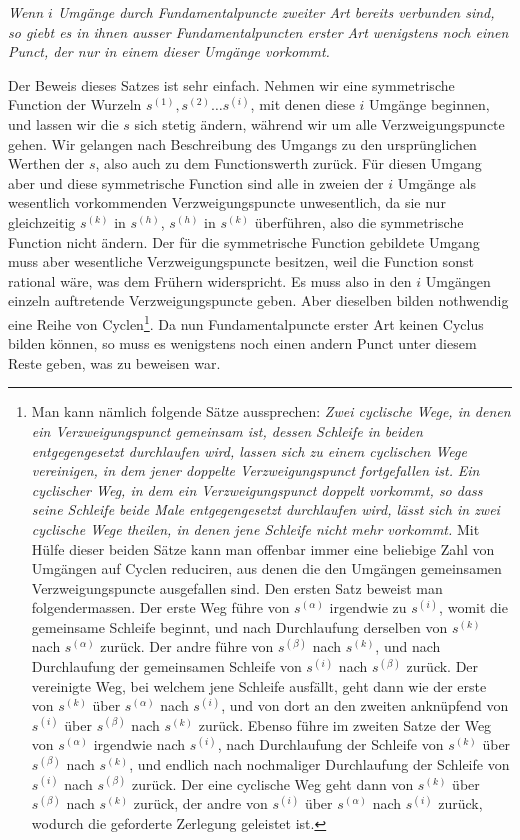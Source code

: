\documentclass[10pt]{article}
\begin{document}
\begin{center}
\emph{Wenn \(i\) Umgänge durch Fundamentalpuncte zweiter Art bereits verbunden sind, so giebt es in ihnen ausser Fundamentalpuncten erster Art wenigstens noch einen Punct, der nur in einem dieser Umgänge vorkommt.}
\end{center}

Der Beweis dieses Satzes ist sehr einfach. Nehmen wir eine symmetrische Function der Wurzeln \(s^{(1)},s^{(2)}\ldots s^{(i)}\), mit denen diese \(i\) Umgänge beginnen, und lassen wir die \(s\) sich stetig ändern, während wir um alle Verzweigungspuncte gehen. Wir gelangen nach Beschreibung des Umgangs zu den ursprünglichen Werthen der \(s\), also auch zu dem Functionswerth zurück. Für diesen Umgang aber und diese symmetrische Function sind alle in zweien der \(i\) Umgänge als wesentlich vorkommenden Verzweigungspuncte unwesentlich, da sie nur gleichzeitig \(s^{(k)}\) in \(s^{(h)}\), \(s^{(h)}\) in \(s^{(k)}\) überführen, also die symmetrische Function nicht ändern. Der für die symmetrische Function gebildete Umgang muss aber wesentliche Verzweigungspuncte besitzen, weil die Function sonst rational wäre, was dem Frühern widerspricht. Es muss also in den \(i\) Umgängen einzeln auftretende Verzweigungspuncte geben. Aber dieselben bilden nothwendig eine Reihe von Cyclen\footnote{Man kann nämlich folgende Sätze aussprechen: \emph{Zwei cyclische Wege, in denen ein Verzweigungspunct gemeinsam ist, dessen Schleife in beiden entgegengesetzt durchlaufen wird, lassen sich zu einem cyclischen Wege vereinigen, in dem jener doppelte Verzweigungspunct fortgefallen ist.} \emph{Ein cyclischer Weg, in dem ein Verzweigungspunct doppelt vorkommt, so dass seine Schleife beide Male entgegengesetzt durchlaufen wird, lässt sich in zwei cyclische Wege theilen, in denen jene Schleife nicht mehr vorkommt.} Mit Hülfe dieser beiden Sätze kann man offenbar immer eine beliebige Zahl von Umgängen auf Cyclen reduciren, aus denen die den Umgängen gemeinsamen Verzweigungspuncte ausgefallen sind. Den ersten Satz beweist man folgendermassen. Der erste Weg führe von \(s^{(\alpha)}\) irgendwie zu \(s^{(i)}\), womit die gemeinsame Schleife beginnt, und nach Durchlaufung derselben von \(s^{(k)}\) nach \(s^{(\alpha)}\) zurück. Der andre führe von \(s^{(\beta)}\) nach \(s^{(k)}\), und nach Durchlaufung der gemeinsamen Schleife von \(s^{(i)}\) nach \(s^{(\beta)}\) zurück. Der vereinigte Weg, bei welchem jene Schleife ausfällt, geht dann wie der erste von \(s^{(k)}\) über \(s^{(\alpha)}\) nach \(s^{(i)}\), und von dort an den zweiten anknüpfend von \(s^{(i)}\) über \(s^{(\beta)}\) nach \(s^{(k)}\) zurück. Ebenso führe im zweiten Satze der Weg von \(s^{(\alpha)}\) irgendwie nach \(s^{(i)}\), nach Durchlaufung der Schleife von \(s^{(k)}\) über \(s^{(\beta)}\) nach \(s^{(k)}\), und endlich nach nochmaliger Durchlaufung der Schleife von \(s^{(i)}\) nach \(s^{(\beta)}\) zurück. Der eine cyclische Weg geht dann von \(s^{(k)}\) über \(s^{(\beta)}\) nach \(s^{(k)}\) zurück, der andre von \(s^{(i)}\) über \(s^{(\alpha)}\) nach \(s^{(i)}\) zurück, wodurch die geforderte Zerlegung geleistet ist.}. Da nun Fundamentalpuncte erster Art keinen Cyclus bilden können, so muss es wenigstens noch einen andern Punct unter diesem Reste geben, was zu beweisen war.
\end{document}
